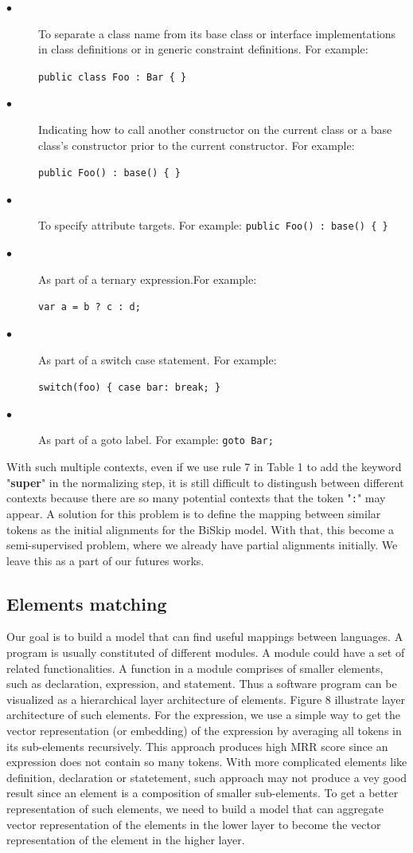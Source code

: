 \begin{description}
	\item [$\bullet$] To separate a class name from its base class or interface implementations in class definitions or in generic constraint definitions. For example: 
	
	\texttt{public class Foo : Bar \{ \}}
	\item [$\bullet$] Indicating how to call another constructor on the current class or a base class's constructor prior to the current constructor. For example: 
	
	\texttt{public Foo() : base() \{ \}}
	\item [$\bullet$] To specify attribute targets. For example: \texttt{public Foo() : base() \{ \}}
	\item [$\bullet$] As part of a ternary expression.For example:
	
 	\texttt{var a = b ? c : d;}
	\item [$\bullet$] As part of a switch case statement. For example:
	
	 \texttt{switch(foo) \{ case bar: break; \}}
	\item [$\bullet$] As part of a goto label. For example:
	\texttt{goto Bar;}

\end{description}

With such multiple contexts, even if we use rule 7 in Table 1 to add the keyword "\textbf{super}" in the normalizing step, it is still difficult to distingush between different contexts because there are so many potential contexts that the token "\texttt{:}" may appear. A solution for this problem is to define the mapping between similar tokens as the initial alignments for the BiSkip model. With that, this become a semi-supervised problem, where we already have partial alignments initially. We leave this as a part of our futures works.

\subsection{Elements matching}

Our goal is to build a model that can find useful mappings between languages. A program is usually constituted of different modules. A module could have a set of related functionalities. A function in a module comprises of smaller elements, such as declaration, expression, and statement. Thus a software program can be visualized as a hierarchical layer architecture of elements. Figure 8 illustrate layer architecture of such elements. For the expression, we use a simple way to get the vector representation (or embedding) of the expression by averaging all tokens in its sub-elements recursively. This approach produces high MRR score since an expression does not contain so many tokens. With more complicated elements like definition, declaration or statetement, such approach may not produce a vey good result since an element is a composition of smaller sub-elements. To get a better representation of such elements, we need to build a model that can aggregate vector representation of the elements in the lower layer to become the vector representation of the element in the higher layer. 

